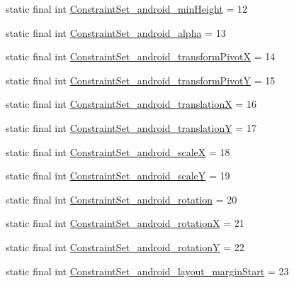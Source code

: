 \begin{DoxyCompactItemize}
\item 
static final int \mbox{\hyperlink{classandroid_1_1support_1_1constraint_1_1_r_1_1styleable_a01eb5b1ba6188169913c61fc7a576952}{Constraint\+Set\+\_\+android\+\_\+min\+Height}} = 12
\item 
static final int \mbox{\hyperlink{classandroid_1_1support_1_1constraint_1_1_r_1_1styleable_a8471fef09cf72eaaacf4d59a3438380c}{Constraint\+Set\+\_\+android\+\_\+alpha}} = 13
\item 
static final int \mbox{\hyperlink{classandroid_1_1support_1_1constraint_1_1_r_1_1styleable_ab451e2e87598a7e2cffcfc11b8acb7c6}{Constraint\+Set\+\_\+android\+\_\+transform\+PivotX}} = 14
\item 
static final int \mbox{\hyperlink{classandroid_1_1support_1_1constraint_1_1_r_1_1styleable_ac7f0a1358bbe22a6031fd70ed94d3982}{Constraint\+Set\+\_\+android\+\_\+transform\+PivotY}} = 15
\item 
static final int \mbox{\hyperlink{classandroid_1_1support_1_1constraint_1_1_r_1_1styleable_a6020c0928dcc85df8c8a2992812d3a68}{Constraint\+Set\+\_\+android\+\_\+translationX}} = 16
\item 
static final int \mbox{\hyperlink{classandroid_1_1support_1_1constraint_1_1_r_1_1styleable_a497ff53e1e9813f93a95af209a271541}{Constraint\+Set\+\_\+android\+\_\+translationY}} = 17
\item 
static final int \mbox{\hyperlink{classandroid_1_1support_1_1constraint_1_1_r_1_1styleable_afb8151f55ba5f9686147eb6623b574dd}{Constraint\+Set\+\_\+android\+\_\+scaleX}} = 18
\item 
static final int \mbox{\hyperlink{classandroid_1_1support_1_1constraint_1_1_r_1_1styleable_af43f35d4778c0c37a7672e5b71496361}{Constraint\+Set\+\_\+android\+\_\+scaleY}} = 19
\item 
static final int \mbox{\hyperlink{classandroid_1_1support_1_1constraint_1_1_r_1_1styleable_a9440ba6fb3a65109dad589750baa6608}{Constraint\+Set\+\_\+android\+\_\+rotation}} = 20
\item 
static final int \mbox{\hyperlink{classandroid_1_1support_1_1constraint_1_1_r_1_1styleable_adcd86d1203cf62e01d8acd030467b016}{Constraint\+Set\+\_\+android\+\_\+rotationX}} = 21
\item 
static final int \mbox{\hyperlink{classandroid_1_1support_1_1constraint_1_1_r_1_1styleable_aa85267d8d43577261bc4cb0cb538d319}{Constraint\+Set\+\_\+android\+\_\+rotationY}} = 22
\item 
static final int \mbox{\hyperlink{classandroid_1_1support_1_1constraint_1_1_r_1_1styleable_a26f261aa342417d080ab899903f6ff06}{Constraint\+Set\+\_\+android\+\_\+layout\+\_\+margin\+Start}} = 23

\end{DoxyCompactItemize}
